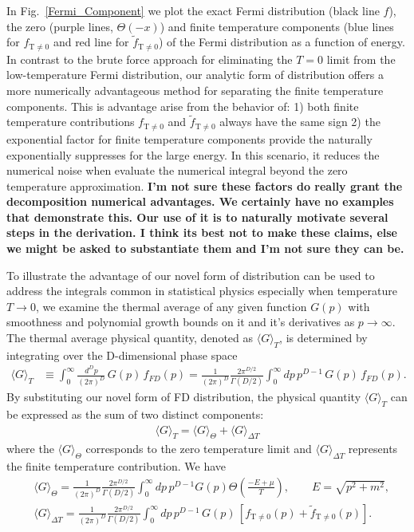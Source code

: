 \documentclass[sn-mathphys,Numbered]{sn-jnl}
\begin{document}
 In Fig.~\ref{Fermi_Component} we plot the exact Fermi distribution (black line $f$), the zero (purple lines, $\Theta(-x)$) and finite temperature components (blue lines for $f_\mathrm{T\neq0}$ and red line for $\widetilde f_\mathrm{T\neq0}$) of the Fermi distribution as a function of energy.
In contrast to the brute force approach for eliminating the $T=0$ limit from the low-temperature Fermi distribution, our analytic form of distribution offers a more numerically advantageous method for separating the finite temperature components. This is advantage arise from the behavior of: 1) both finite temperature contributions $f_\mathrm{T\neq0}$ and $\widetilde f_\mathrm{T\neq0}$ always have the same sign 2) the exponential factor for finite temperature components provide the naturally exponentially suppresses for the large energy. In this scenario, it reduces the numerical noise when evaluate the numerical integral beyond the zero temperature approximation. {\bf I'm not sure these factors do really grant the decomposition numerical advantages.  We certainly have no examples that demonstrate this.  Our use of it is to naturally motivate several steps in the derivation.  I think its best not to make these claims, else we might be asked to substantiate them and I'm not sure they can be.}

To illustrate the advantage of our novel form of distribution can be used to address the integrals common in statistical physics especially when temperature $T\to0$, we examine the thermal average of any given function $G(p)$ with smoothness and polynomial growth bounds on it and it's derivatives as $p\to \infty$. The thermal average physical quantity, denoted as $\langle G\rangle_T$, is determined by integrating over the D-dimensional phase space 
\begin{align}\label{eq:avg_G_T}
\langle G\rangle_T&\equiv\int^{\infty}_{0}\!\!\frac{d^Dp}{(2\pi)^D}\,G(p)\,f_{FD}(p)=\frac{1}{(2\pi)^D}\frac{2\pi^{D/2}}{\Gamma(D/2)}\int^{\infty}_{0}\!\!dp\,p^{D-1}\,G(p)\,f_{FD}(p).
\end{align}
By substituting our novel form of FD distribution, the physical quantity $\langle G\rangle_T$ can be expressed as the sum of two distinct components:
\begin{align}
\langle G\rangle_T=\langle G\rangle_{\Theta}+\langle G\rangle_{\Delta T}
\end{align}
 where the $\langle G\rangle_{\Theta}$ corresponds to the zero temperature limit and $\langle G\rangle_{\Delta T}$ represents the finite temperature contribution. We have
\begin{align}
&\langle G\rangle_{\Theta}=\frac{1}{(2\pi)^D}\frac{2\pi^{D/2}}{\Gamma(D/2)}\int^{\infty}_{0}\!\!dp\,p^{D-1}G(p)\Theta\left(\frac{-E+\mu}{T}\right),\qquad E=\sqrt{p^2+m^2},\\
&\langle G\rangle_{\Delta T}=\frac{1}{(2\pi)^D}\frac{2\pi^{D/2}}{\Gamma(D/2)}\int^{\infty}_{0}\!\!dp\,p^{D-1}\,G(p)\,\left[f_\mathrm{T\neq0}(p)+\widetilde f_\mathrm{T\neq0}(p)\right].\label{G_deltaT}
\end{align}
\end{document}
